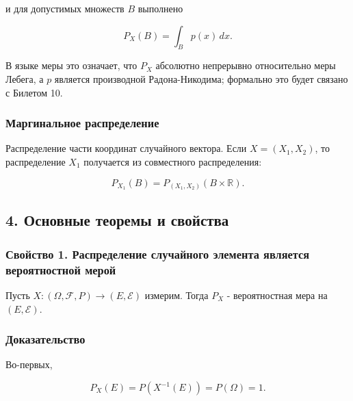 \documentclass[
  11pt,
  a4paper,
]{article}
\begin{document}
и для допустимых множеств \(B\) выполнено

\[
P_X(B)=\int_B p(x)\,dx.
\]

В языке меры это означает, что \(P_X\) абсолютно непрерывно относительно
меры Лебега, а \(p\) является производной Радона-Никодима; формально это
будет связано с Билетом 10.

\subsubsection{Маргинальное
распределение}\label{ux43cux430ux440ux433ux438ux43dux430ux43bux44cux43dux43eux435-ux440ux430ux441ux43fux440ux435ux434ux435ux43bux435ux43dux438ux435}

Распределение части координат случайного вектора. Если \(X=(X_1,X_2)\),
то распределение \(X_1\) получается из совместного распределения:

\[
P_{X_1}(B)=P_{(X_1,X_2)}(B\times\mathbb R).
\]

\subsection{4. Основные теоремы и
свойства}\label{ux43eux441ux43dux43eux432ux43dux44bux435-ux442ux435ux43eux440ux435ux43cux44b-ux438-ux441ux432ux43eux439ux441ux442ux432ux430}

\subsubsection{Свойство 1. Распределение случайного элемента является
вероятностной
мерой}\label{ux441ux432ux43eux439ux441ux442ux432ux43e-1.-ux440ux430ux441ux43fux440ux435ux434ux435ux43bux435ux43dux438ux435-ux441ux43bux443ux447ux430ux439ux43dux43eux433ux43e-ux44dux43bux435ux43cux435ux43dux442ux430-ux44fux432ux43bux44fux435ux442ux441ux44f-ux432ux435ux440ux43eux44fux442ux43dux43eux441ux442ux43dux43eux439-ux43cux435ux440ux43eux439}

Пусть \(X:(\Omega,\mathcal F,P)\to(E,\mathcal E)\) измерим. Тогда
\(P_X\) - вероятностная мера на \((E,\mathcal E)\).

\subsubsection{Доказательство}\label{ux434ux43eux43aux430ux437ux430ux442ux435ux43bux44cux441ux442ux432ux43e}

Во-первых,

\[
P_X(E)=P(X^{-1}(E))=P(\Omega)=1.
\]
\end{document}
